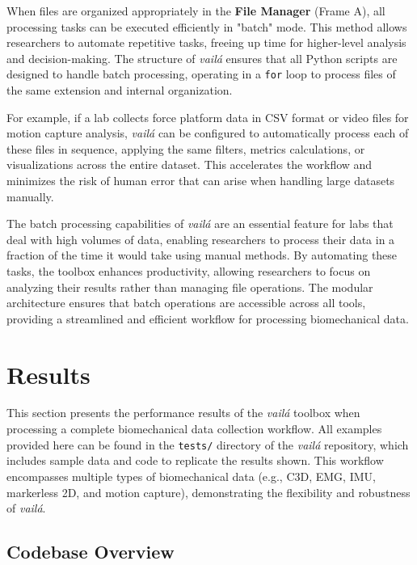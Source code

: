 \documentclass{article}
\begin{document}
When files are organized appropriately in the \textbf{File Manager} (Frame A), all processing tasks can be executed efficiently in "batch" mode. This method allows researchers to automate repetitive tasks, freeing up time for higher-level analysis and decision-making. The structure of \textit{vailá} ensures that all Python scripts are designed to handle batch processing, operating in a \texttt{for} loop to process files of the same extension and internal organization.

For example, if a lab collects force platform data in CSV format or video files for motion capture analysis, \textit{vailá} can be configured to automatically process each of these files in sequence, applying the same filters, metrics calculations, or visualizations across the entire dataset. This accelerates the workflow and minimizes the risk of human error that can arise when handling large datasets manually.

The batch processing capabilities of \textit{vailá} are an essential feature for labs that deal with high volumes of data, enabling researchers to process their data in a fraction of the time it would take using manual methods. By automating these tasks, the toolbox enhances productivity, allowing researchers to focus on analyzing their results rather than managing file operations. The modular architecture ensures that batch operations are accessible across all tools, providing a streamlined and efficient workflow for processing biomechanical data.

\section{Results}

This section presents the performance results of the \textit{vailá} toolbox when processing a complete biomechanical data collection workflow. All examples provided here can be found in the \texttt{tests/} directory of the \textit{vailá} repository, which includes sample data and code to replicate the results shown. This workflow encompasses multiple types of biomechanical data (e.g., C3D, EMG, IMU, markerless 2D, and motion capture), demonstrating the flexibility and robustness of \textit{vailá}.

\subsection{Codebase Overview}
\end{document}
